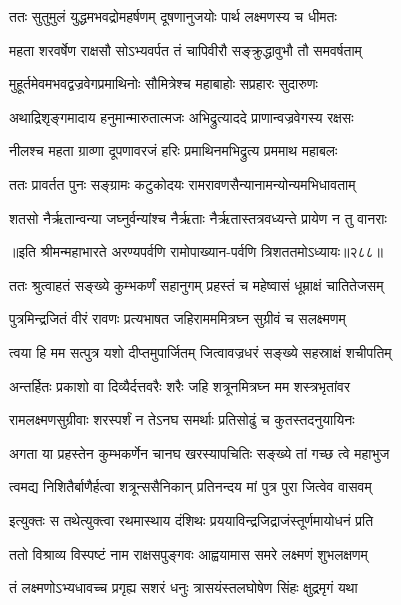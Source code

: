 \twolineshloka
{ततः सुतुमुलं युद्धमभवद्रोमहर्षणम्}
{दूषणानुजयोः पार्थ लक्ष्मणस्य च धीमतः}


\twolineshloka
{महता शरवर्षेण राक्षसौ सोऽभ्यवर्पत}
{तं चापिवीरौ सङ्क्रुद्धावुभौ तौ समवर्षताम्}


\twolineshloka
{मुहूर्तमेवमभवद्वज्रवेगप्रमाथिनोः}
{सौमित्रेश्च महाबाहोः सप्रहारः सुदारुणः}


\twolineshloka
{अथाद्रिशृङ्गमादाय हनुमान्मारुतात्मजः}
{अभिद्रुत्याददे प्राणान्वज्रवेगस्य रक्षसः}


\twolineshloka
{नीलश्च महता ग्राव्णा दूपणावरजं हरिः}
{प्रमाथिनमभिद्रुत्य प्रममाथ महाबलः}


\twolineshloka
{ततः प्रावर्तत पुनः सङ्ग्रामः कटुकोदयः}
{रामरावणसैन्यानामन्योन्यमभिधावताम्}


\twolineshloka
{शतसो नैर्ऋतान्वन्या जघ्नुर्वन्यांश्च नैर्ऋताः}
{नैर्ऋतास्तत्रवध्यन्ते प्रायेण न तु वानराः}


॥इति श्रीमन्महाभारते अरण्यपर्वणि रामोपाख्यान-पर्वणि त्रिशततमोऽध्यायः॥२८८॥

\storymeta

\resetShloka



\twolineshloka
{ततः श्रुत्वाहतं सङ्ख्ये कुम्भकर्णं सहानुगम्}
{प्रहस्तं च महेष्वासं धूम्राक्षं चातितेजसम्}


\twolineshloka
{पुत्रमिन्द्रजितं वीरं रावणः प्रत्यभाषत}
{जहिरामममित्रघ्न सुग्रीवं च सलक्ष्मणम्}


\twolineshloka
{त्वया हि मम सत्पुत्र यशो दीप्तमुपार्जितम्}
{जित्वावज्रधरं सङ्ख्ये सहस्राक्षं शचीपतिम्}


\twolineshloka
{अन्तर्हितः प्रकाशो वा दिव्यैर्दत्तवरैः शरैः}
{जहि शत्रूनमित्रघ्न मम शस्त्रभृतांवर}


\twolineshloka
{रामलक्ष्मणसुग्रीवाः शरस्पर्शं न तेऽनघ}
{समर्थाः प्रतिसोढुं च कुतस्तदनुयायिनः}


\twolineshloka
{अगता या प्रहस्तेन कुम्भकर्णेन चानघ}
{खरस्यापचितिः सङ्ख्ये तां गच्छ त्वे महाभुज}


\twolineshloka
{त्वमद्य निशितैर्बाणैर्हत्वा शत्रून्ससैनिकान्}
{प्रतिनन्दय मां पुत्र पुरा जित्वेव वासवम्}


\twolineshloka
{इत्युक्तः स तथेत्युक्त्वा रथमास्थाय दंशिथः}
{प्रययाविन्द्रजिद्राजंस्तूर्णमायोधनं प्रति}


\twolineshloka
{ततो विश्राव्य विस्पष्टं नाम राक्षसपुङ्गवः}
{आह्वयामास समरे लक्ष्मणं शुभलक्षणम्}


\twolineshloka
{तं लक्ष्मणोऽभ्यधावच्च प्रगृह्य सशरं धनुः}
{त्रासयंस्तलघोषेण सिंहः क्षुद्रमृगं यथा}


